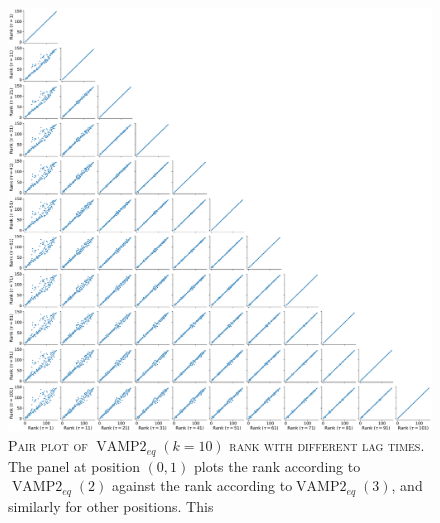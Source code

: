 \documentclass{article}
\begin{document}
\begin{figure}
    \centering
    \includegraphics[width=1.0\textwidth]{SI_figures/1fme_vampeq_rank_vs_lag_pairplot_k10.pdf}
    \caption{\textsc{Pair plot of $\operatorname{VAMP2}_{eq}(k=10)$ rank with different lag times.} The panel at position $(0,1)$ plots the rank according to$\operatorname{VAMP2}_{eq}(2)$ against the  rank according to$\operatorname{VAMP2}_{eq}(3)$, and similarly for other positions. This }
    \label{fig:vampeq10_rank_vs_lag_pairplot}
\end{figure}



\end{document}

